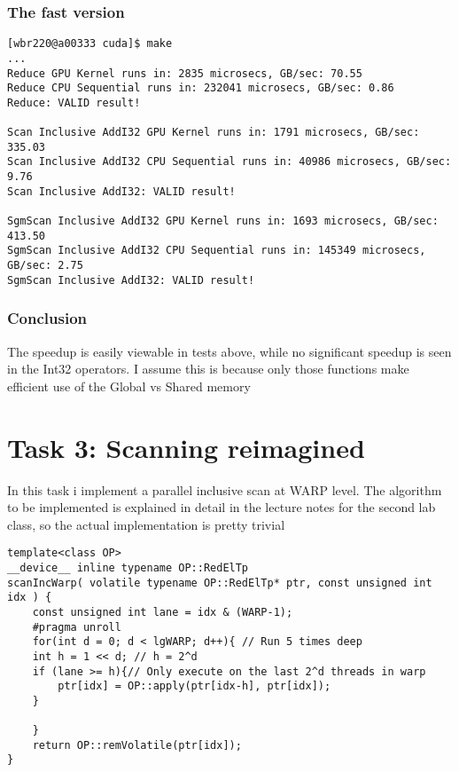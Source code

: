 \documentclass[11pt]{article}
\begin{document}
\subsubsection{The fast version}
\label{sec:orged47846}
\begin{verbatim}
[wbr220@a00333 cuda]$ make
...
Reduce GPU Kernel runs in: 2835 microsecs, GB/sec: 70.55
Reduce CPU Sequential runs in: 232041 microsecs, GB/sec: 0.86
Reduce: VALID result!

Scan Inclusive AddI32 GPU Kernel runs in: 1791 microsecs, GB/sec: 335.03
Scan Inclusive AddI32 CPU Sequential runs in: 40986 microsecs, GB/sec: 9.76
Scan Inclusive AddI32: VALID result!

SgmScan Inclusive AddI32 GPU Kernel runs in: 1693 microsecs, GB/sec: 413.50
SgmScan Inclusive AddI32 CPU Sequential runs in: 145349 microsecs, GB/sec: 2.75
SgmScan Inclusive AddI32: VALID result!
\end{verbatim}
\subsubsection{Conclusion}
\label{sec:org8aed903}
The speedup is easily viewable in tests above, while no significant speedup
is seen in the Int32 operators. I assume this is because only those functions
make efficient use of the Global vs Shared memory

\section{Task 3: Scanning reimagined}
\label{sec:org52094bb}
In this task i implement a parallel inclusive scan at WARP level. The algorithm
to be implemented is explained in detail in the lecture notes for the second 
lab class, so the actual implementation is pretty trivial
\begin{verbatim}
template<class OP>
__device__ inline typename OP::RedElTp
scanIncWarp( volatile typename OP::RedElTp* ptr, const unsigned int idx ) {
    const unsigned int lane = idx & (WARP-1);
    #pragma unroll
    for(int d = 0; d < lgWARP; d++){ // Run 5 times deep
	int h = 1 << d; // h = 2^d
	if (lane >= h){// Only execute on the last 2^d threads in warp
	    ptr[idx] = OP::apply(ptr[idx-h], ptr[idx]);
	}

    }
    return OP::remVolatile(ptr[idx]);
}
\end{verbatim}
\end{document}
